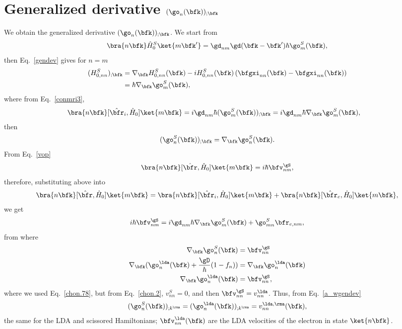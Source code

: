 \section{Generalized derivative \texorpdfstring{$(\go_n(\bfk))_{;\bfk}$}{(wn);k}}\label{gwk}

We obtain the
generalized derivative $(\go_n(\bfk))_{;\bfk}$.
We start from
\begin{align}\label{a_conH0}
\bra{n\bfk}\hat{H}^S_0\ket{m\bfk'}=\gd_{nm}\gd(\bfk-\bfk')\hbar\go^S_m(\bfk)
,
\end{align}
then Eq.~\eqref{gendev} gives for $n=m$
\begin{align}\label{a_genderH0}
(H^S_{0,nn})_{;\bfk}&=
\nabla_\bfk
H^S_{0,n n}(\bfk)
-
i
H^S_{0,nn}(\bfk)
\left(
\bfgxi_{nn}(\bfk)
-
\bfgxi_{nn}(\bfk)
\right)
\nonumber\\
&=
\hbar\nabla_\bfk\go^S_m(\bfk)
,
\end{align}
where from Eq.~\eqref{conmri3}, 
\begin{align}\label{a_rih0}
\bra{n\bfk}[\hat\bfr_i,\hat{H}_0]\ket{m\bfk}&=
i\gd_{nm}\hbar(\go^S_m(\bfk))_{;\bfk}
=
i\gd_{nm}\hbar\nabla_\bfk\go^S_m(\bfk)
,
\end{align}
then
\begin{align}\label{a_wgendev}
(\go^S_n(\bfk))_{;\bfk}=
\nabla_\bfk\go^S_n(\bfk)
.
\end{align}
From Eq.~\eqref{vop} 
\begin{align}\label{a_hr}
\bra{n\bfk}[\hat\bfr,\hat{H}_0]\ket{m\bfk}=
i\hbar\bfv^\gS_{nm}
,
\end{align}
therefore, substituting above into
\begin{align}\label{a_hrt}
\bra{n\bfk}[\hat\bfr,\hat{H}_0]\ket{m\bfk}=
\bra{n\bfk}[\hat\bfr_i,\hat{H}_0]\ket{m\bfk}
+
\bra{n\bfk}[\hat\bfr_e,\hat{H}_0]\ket{m\bfk}
,
\end{align}
we get
\begin{align}\label{a_hrt2}
i\hbar\bfv^\gS_{nm}=
i\gd_{nm}\hbar\nabla_\bfk\go^S_m(\bfk)
+
\go^S_{mn}\bfr_{e,nm}
,
\end{align}
from where
\begin{align}\label{a_gradw}
\nabla_\bfk\go^S_n(\bfk)
&=
\bfv^\gS_{nn}
\nonumber\\
\nabla_\bfk(\go^\lda_n(\bfk)+\frac{\gD}{\hbar}(1-f_n))
&=
\nabla_\bfk\go^\lda_n(\bfk)
\nonumber\\
\nabla_\bfk\go^\lda_n(\bfk)
&=
\bfv^\gS_{nn}
,
\end{align}
where we used Eq.~\eqref{chon.78},
but from 
Eq.~\eqref{chon.2}, $v^S_{nn}=0$, and then
$\bfv^\gS_{nn}=v^\lda_{nn}$.
Thus,  from Eq.~\eqref{a_wgendev}
\begin{align}\label{a_gradw2}
(\go^S_n(\bfk))_{;k^{\rma}}=
(\go^\lda_n(\bfk))_{;k^{\rma}}=
v^{\lda,\rma}_{nn}(\bfk)
,
\end{align}
the same for the LDA and scissored Hamiltonians; $\bfv_{nn}^\lda(\bfk)$ are
the LDA velocities of the electron in state $\ket{n\bfk}$.

